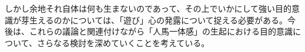 
しかし余地それ自体は何も生まないのであって、その上でいかにして強い目的意識が芽生えるのかについては、「遊び」心の発露について捉える必要がある。今後は、これらの議論と関連付けながら「人馬一体感」の生起における目的意識について、さらなる検討を深めていくことを考えている。



